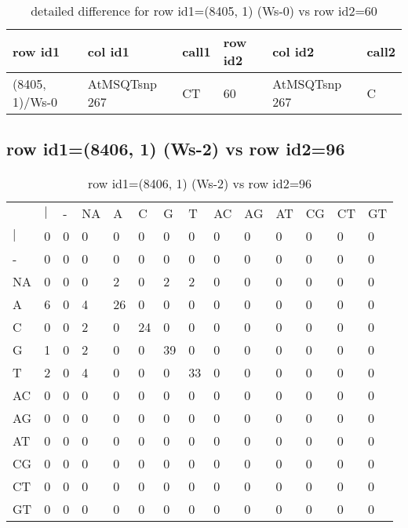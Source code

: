 \begin{center}
\begin{longtable}{|l|l|l|l|l|l|}
\caption{detailed difference for row id1=(8405, 1) (Ws-0) vs row id2=60} \label{table_dm471}\\
\hline
row id1&col id1&call1&row id2&col id2&call2\\
\hline
(8405, 1)/Ws-0&AtMSQTsnp 267&CT&60&AtMSQTsnp 267&C\\
\hline
\end{longtable}
\end{center}

\subsection{row id1=(8406, 1) (Ws-2) vs row id2=96}
\begin{center}
\begin{longtable}{|l|l|l|l|l|l|l|l|l|l|l|l|l|l|}
\caption{row id1=(8406, 1) (Ws-2) vs row id2=96} \label{table_dm472}\\
\hline
\\
\hline
&$|$&-&NA&A&C&G&T&AC&AG&AT&CG&CT&GT\\
$|$&0&0&0&0&0&0&0&0&0&0&0&0&0\\
-&0&0&0&0&0&0&0&0&0&0&0&0&0\\
NA&0&0&0&2&0&2&2&0&0&0&0&0&0\\
A&6&0&4&26&0&0&0&0&0&0&0&0&0\\
C&0&0&2&0&24&0&0&0&0&0&0&0&0\\
G&1&0&2&0&0&39&0&0&0&0&0&0&0\\
T&2&0&4&0&0&0&33&0&0&0&0&0&0\\
AC&0&0&0&0&0&0&0&0&0&0&0&0&0\\
AG&0&0&0&0&0&0&0&0&0&0&0&0&0\\
AT&0&0&0&0&0&0&0&0&0&0&0&0&0\\
CG&0&0&0&0&0&0&0&0&0&0&0&0&0\\
CT&0&0&0&0&0&0&0&0&0&0&0&0&0\\
GT&0&0&0&0&0&0&0&0&0&0&0&0&0\\
\hline
\end{longtable}
\end{center}

